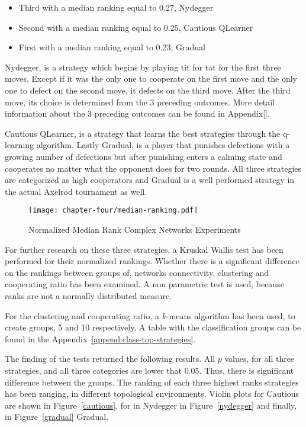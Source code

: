 \begin{itemize}
	\item Third with a median ranking equal to 0.27, Nydegger
	\item Second with a median ranking equal to 0.25, Cautious QLearner
	\item First with a median ranking equal to 0.23, Gradual
\end{itemize}

Nydegger, is a strategy which begins by playing  tit for tat for the first
three moves. Except if it was the only one to cooperate on the first move and
the only one to defect on the second move, it defects on the third move.
After the third move,  its choice is determined from the 3 preceding outcomes.
More detail information about the 3 preceding outcomes can be found in Appendix[].

Cautious QLearner, is a strategy that learns the best strategies through the
q-learning algorithm. Lastly Gradual, is a player that punishes defections with
a growing number of defections but after punishing enters a calming state and
cooperates no matter what the opponent does for two rounds. All three strategies
are categorized as high cooperators and Gradual is a well performed strategy
in the actual Axelrod tournament as well.

\begin{figure}[!hbtp]
	\texttt{[image: chapter-four/median-ranking.pdf]}
	\caption{Normalized Median Rank Complex Networks Experiments}
	\label{ranking-second-gen}
\end{figure}

For further research on these three strategies, a Kruskal Wallis test
has been performed for their normalized rankings. Whether there is a significant
difference on the rankings between groups of, networks connectivity, clustering
and cooperating ratio has been examined. A non parametric test is used, because
ranks are not a normally distributed measure.

For the clustering and cooperating ratio, a \(k\)-means algorithm has been used,
to create groups, 5 and 10 respectively. A table with the classification groups
can be found in the Appendix~\ref{append:class-top-strategies}.

The finding of the tests returned the following results. All \(p\) values, for
all three strategies, and all three
categories are lower that 0.05. Thus, there is significant difference between the
groups. The ranking of each three highest ranks strategies has been ranging, in
different topological environments. Violin plots for Cautious are shown
in Figure~\ref{cautious}, for in Nydegger in Figure~\ref{nydegger} and finally,
in Figure~\ref{gradual} Gradual.

